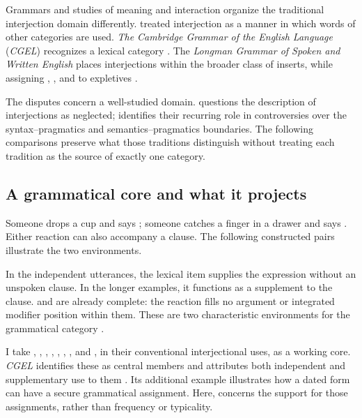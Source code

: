 \documentclass[12pt]{article}
\newcommand{\exmention}[1]{\mention{#1}}
\begin{document}
Grammars and studies of meaning and interaction organize the traditional
interjection domain differently. \textcite[90]{jespersen1924} treated
interjection as a manner in which words of other categories are used.
\textit{The Cambridge Grammar of the English Language} (\textit{CGEL})
recognizes a lexical category \citep[22]{HuddlestonPullum2002}. The
\textit{Longman Grammar of Spoken and Written English} places interjections
within the broader class of inserts, while assigning ,
, and  to expletives
\citep[1082--1083, 1094--1095]{Biber1999}.

The disputes concern a well-studied domain. \textcite{libert2019} questions
the description of interjections as neglected; \textcite[63]{cram2008}
identifies their recurring role in controversies over the syntax--pragmatics
and semantics--pragmatics boundaries. The following comparisons preserve
what those traditions distinguish without treating each tradition as the
source of exactly one category.

\subsection{A grammatical core and what it projects}\label{sec:grammatical-core}

Someone drops a cup and says ; someone catches a finger
in a drawer and says . Either reaction can also accompany
a clause. The following constructed pairs illustrate the two environments.

\ea\label{ex:core-distribution}
  \ea \exmention{Oops!}\qquad\exmention{Oops, I've dropped it!}
  \ex \exmention{Ouch!}\qquad\exmention{Ouch, that hurt!}
  \z
\z

In the independent utterances, the lexical item supplies the expression
without an unspoken clause. In the longer examples, it functions as
a supplement to the clause.  and  are already complete: the reaction fills no argument or integrated
modifier position within them. These are two characteristic environments
for the grammatical category .

I take , , , ,
, , , and , in
their conventional interjectional uses, as a working core. \textit{CGEL}
identifies these as central members and attributes both independent
and supplementary use to them \citep[1361]{HuddlestonPullum2002}.
Its additional example  illustrates how a dated form
can have a secure grammatical assignment. Here,  concerns
the support for those assignments, rather than frequency or typicality.
\end{document}
